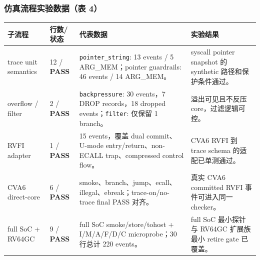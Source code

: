 \documentclass[aspectratio=169,10pt]{beamer}
\newcommand{\tagok}[1]{\textcolor{rvgreen}{\textbf{#1}}}
\begin{document}
\begin{frame}
  \frametitle{仿真流程实验数据（表 4）}
  \vskip0.05cm
  \begin{center}\scriptsize
  \renewcommand{\arraystretch}{1.14}
  \begin{tabularx}{0.97\linewidth}{@{}L{2.9cm}L{1.65cm}L{3.55cm}Y@{}}
    \toprule
    \textbf{子流程} & \textbf{行数/状态} & \textbf{代表数据} & \textbf{实验结果} \\
    \midrule
    trace unit semantics & 12 / \tagok{PASS} & \texttt{pointer\_string}: 13 events / 5 ARG\_MEM；pointer guardrails: 46 events / 14 ARG\_MEM。 & syscall pointer snapshot 的 synthetic 路径和保护条件通过。 \\
    overflow / filter & 2 / \tagok{PASS} & \texttt{backpressure}: 30 events，7 DROP records，18 dropped events；\texttt{filter}: 仅保留 1 branch。 & 溢出可见且不反压 core，过滤逻辑可控。 \\
    RVFI adapter & 1 / \tagok{PASS} & 15 events，覆盖 dual commit、U-mode entry/return、non-ECALL trap、compressed control flow。 & CVA6 RVFI 到 trace schema 的适配已单测通过。 \\
    CVA6 direct-core & 6 / \tagok{PASS} & smoke、branch、jump、ecall、illegal、ebreak；trace-on/no-trace final PASS 对齐。 & 真实 CVA6 committed RVFI 事件可进入同一 checker。 \\
    full SoC + RV64GC & 9 / \tagok{PASS} & full SoC smoke/store/tohost + I/M/A/F/D/C microprobe；30 行总计 220 events。 & full SoC 最小探针与 RV64GC 扩展族最小 retire gate 已覆盖。 \\
    \bottomrule
  \end{tabularx}
  \end{center}
\end{frame}
\end{document}
